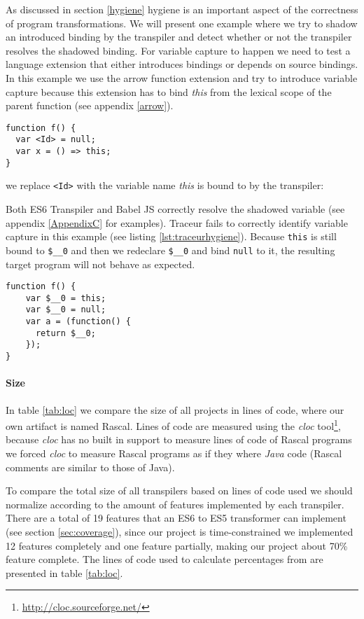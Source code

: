 As discussed in section \ref{hygiene} hygiene is an important aspect of the correctness of program transformations. We will present one example where we try to shadow an introduced binding by the transpiler and detect whether or not the transpiler resolves the shadowed binding. For variable capture to happen we need to test a language extension that either introduces bindings or depends on source bindings. In this example we use the arrow function extension and try to introduce variable capture because this extension has to bind \textit{this} from the lexical scope of the parent function (see appendix \ref{arrow}).

\begin{lstlisting}[label=traceur-capture, caption=Example input to Traceur\protect\footnotemark]
function f() {
  var <Id> = null;
  var x = () => this;
}
\end{lstlisting}

we replace \lstinline$<Id>$ with the variable name \textit{this} is bound to by the transpiler:

Both ES6 Transpiler and Babel JS correctly resolve the shadowed variable (see appendix \ref{AppendixC} for examples). Traceur fails to correctly identify variable capture in this example (see listing \ref{lst:traceurhygiene}). Because \lstinline$this$ is still bound to \lstinline{$__0} and then we redeclare \lstinline{$__0} and bind \lstinline$null$ to it, the resulting target program will not behave as expected.

\begin{lstlisting}[caption=Variable capture in Traceur transpiler,label=lst:traceurhygiene]
function f() {
    var $__0 = this;
    var $__0 = null;
    var a = (function() {
      return $__0;
	});
}
\end{lstlisting}


\paragraph{Size}
In table \ref{tab:loc} we compare the size of all projects in lines of code, where our own artifact is named Rascal. Lines of code are measured using the \textit{cloc} tool\footnote{\url{http://cloc.sourceforge.net/}}, because \textit{cloc} has no built in support to measure lines of code of Rascal programs we forced \textit{cloc} to measure Rascal programs as if they where \textit{Java} code (Rascal comments are similar to those of Java).

To compare the total size of all transpilers based on lines of code used we should normalize according to the amount of features implemented by each transpiler. There are a total of 19 features that an ES6 to ES5 transformer can implement (see section \ref{sec:coverage}), since our project is time-constrained we implemented 12 features completely and one feature partially, making our project about 70\% feature complete. The lines of code used to calculate percentages from are presented in table \ref{tab:loc}.

